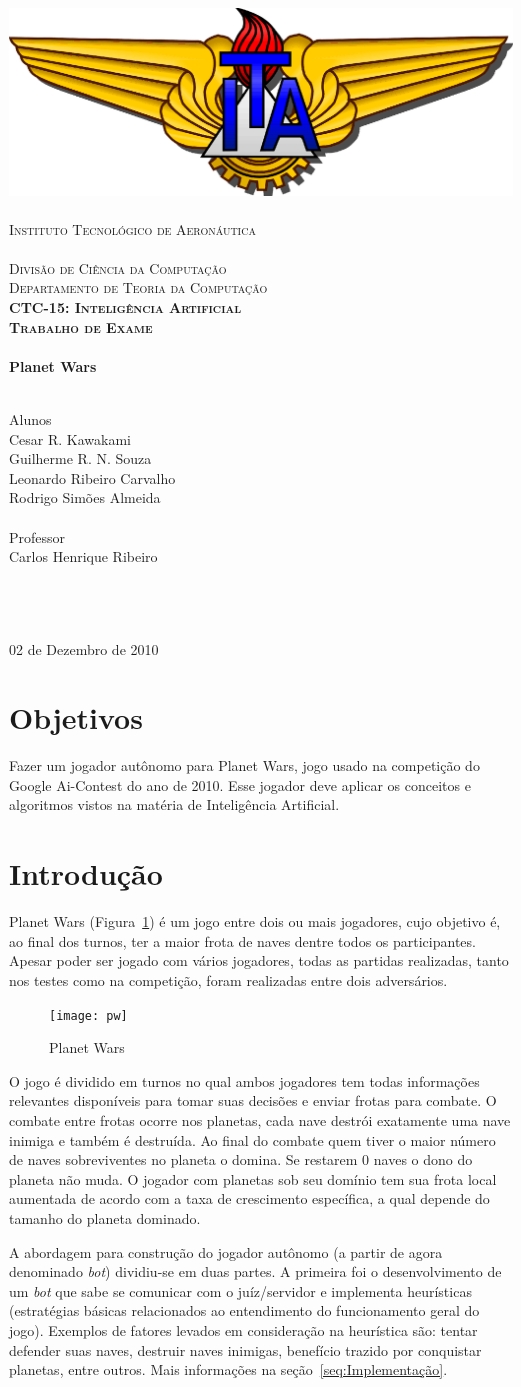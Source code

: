 \documentclass[a4paper,titlepage,11pt]{article}
\newcommand{\mydivision}{Divisão de Ciência da Computação\\Departamento de Teoria da Computação}
\newcommand{\mydiscipline}{CTC-15: Inteligência Artificial}
\newcommand{\mysupertitle}{Trabalho de Exame}
\newcommand{\mytitle}{Planet Wars}
\newcommand{\myname}{Cesar R. Kawakami\\Guilherme R. N. Souza\\Leonardo Ribeiro Carvalho\\Rodrigo Simões Almeida}
\newcommand{\myfieldAname}{Alunos}
\newcommand{\myfieldAcontent}{\myname}
\newcommand{\myfieldBname}{Professor}
\newcommand{\myfieldBcontent}{Carlos Henrique Ribeiro}
\newcommand{\myfieldCname}{\ }
\newcommand{\myfieldCcontent}{\ }
\newcommand{\mydate}{02 de Dezembro de 2010}
\renewcommand{\maketitle}{%
 	\begin{titlepage}
		\begin{center}
			\includegraphics[scale=0.125]{ita}\\
			\ \\ %
			\textsc{%
				\Large Instituto Tecnológico de Aeronáutica\\
				\large%
				\ \\
				\mydivision\\
				\textbf{\mydiscipline}\\
			}
			\vspace{2cm}
			\textbf{%
				\textsc{\large \mysupertitle}\\
				\ \\
				\huge \mytitle\\
				\ \\
			}
			\vspace{2cm}
			\begin{flushleft}
				\large \myfieldAname\\
				\Large \myfieldAcontent\\
				\ \\
				\large \myfieldBname\\
				\Large \myfieldBcontent\\
				\ \\
				\large \myfieldCname\\
				\Large \myfieldCcontent\\
			\end{flushleft}
			\vfill
			{\large \mydate}
		\end{center}		
	\end{titlepage}
}
\begin{document}
\maketitle

\section{Objetivos}

Fazer um jogador autônomo para Planet Wars, jogo usado na competição do Google Ai-Contest do ano de 2010. Esse jogador deve aplicar os conceitos e algoritmos vistos na matéria de Inteligência Artificial.

\section{Introdução}
Planet Wars (Figura~\ref{fig:pw}) é um jogo entre dois ou mais jogadores, cujo objetivo é, ao final dos turnos, ter a maior frota de naves dentre todos os participantes. Apesar poder ser jogado com vários jogadores, todas as partidas realizadas, tanto nos testes como na competição, foram realizadas entre dois adversários.

\begin{figure}[b]
	\centering
	\texttt{[image: pw]}
	\caption{Planet Wars}
	\label{fig:pw}
\end{figure}

O jogo é dividido em turnos no qual ambos jogadores tem todas informações relevantes disponíveis para tomar suas decisões e enviar frotas para combate. O combate entre frotas ocorre nos planetas, cada nave destrói exatamente uma nave inimiga e também é destruída. Ao final do combate quem tiver o maior número de naves sobreviventes no planeta o domina. Se restarem 0 naves o dono do planeta não muda. O jogador com planetas sob seu domínio tem sua frota local aumentada de acordo com a taxa de crescimento específica, a qual depende do tamanho do planeta dominado.

A abordagem para construção do jogador autônomo (a partir de agora denominado {\em bot}) dividiu-se em duas partes. A primeira foi o desenvolvimento de um {\em bot} que sabe se comunicar com o juíz/servidor e implementa heurísticas (estratégias básicas relacionados ao entendimento do funcionamento geral do jogo). Exemplos de fatores levados em consideração na heurística são: tentar defender suas naves, destruir naves inimigas, benefício trazido por conquistar planetas, entre outros. Mais informações na seção~\ref{seq:Implementação}.
\end{document}
